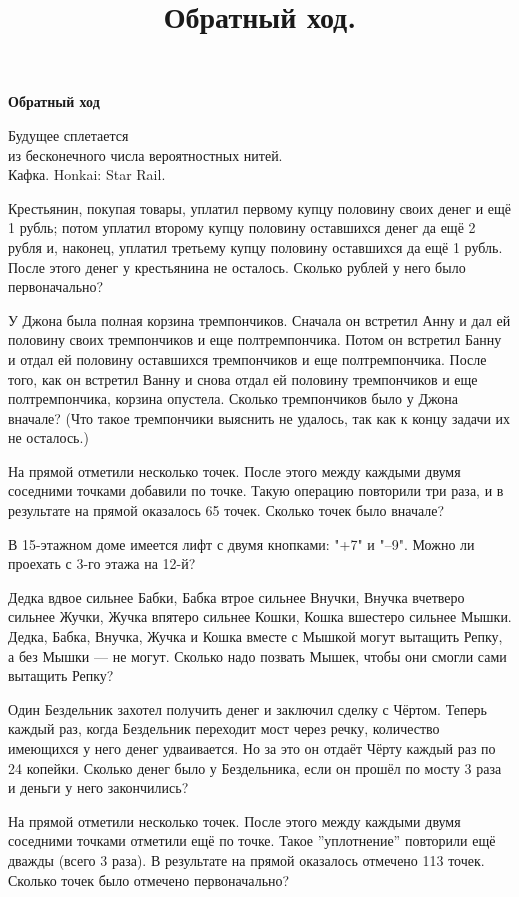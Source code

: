 \centerline{\bf \Huge Обратный ход}
\title{Обратный ход.}

\begin{flushright}
    \scriptsize Будущее сплетается\\ из бесконечного числа вероятностных нитей.\\Кафка. Honkai: Star Rail.
\end{flushright}

 Крестьянин, покупая товары, уплатил первому купцу половину своих денег и ещё 1 рубль; потом уплатил второму купцу половину оставшихся денег да ещё 2 рубля и, наконец, уплатил третьему купцу половину оставшихся да ещё 1 рубль. После этого денег у крестьянина не осталось. Сколько рублей у него было первоначально?

 У Джона была полная корзина тремпончиков. Сначала он встретил Анну и дал ей половину своих тремпончиков и еще полтремпончика. Потом он встретил Банну и отдал ей половину оставшихся тремпончиков и еще полтремпончика. После того, как он встретил Ванну и снова отдал ей половину тремпончиков и еще полтремпончика, корзина опустела. Сколько тремпончиков было у Джона вначале? (Что такое тремпончики выяснить не удалось, так как к концу задачи их не осталось.)

 На прямой отметили несколько точек. После этого между каждыми двумя соседними точками добавили по точке. Такую операцию повторили три раза, и в результате на прямой оказалось 65 точек. Сколько точек было вначале?

 В 15-этажном доме имеется лифт с двумя кнопками: "+7" и "–9". Можно ли проехать с 3-го этажа на 12-й? 

 Дедка вдвое сильнее Бабки, Бабка втрое сильнее Внучки, Внучка вчетверо сильнее Жучки, Жучка впятеро сильнее Кошки, Кошка вшестеро сильнее Мышки. Дедка, Бабка, Внучка, Жучка и Кошка вместе с Мышкой могут вытащить Репку, а без Мышки — не могут. Сколько надо позвать Мышек, чтобы они смогли сами вытащить Репку?

 Один Бездельник захотел получить денег и заключил сделку с Чёртом. Теперь каждый раз, когда Бездельник переходит мост через речку, количество имеющихся у него денег удваивается. Но за это он отдаёт Чёрту каждый раз по 24 копейки. Сколько денег было у Бездельника, если он прошёл по мосту 3 раза и деньги у него закончились?

 На прямой отметили несколько точек. После этого между каждыми двумя соседними точками отметили ещё по точке. Такое ''уплотнение'' повторили ещё дважды (всего 3 раза). В результате на прямой оказалось отмечено 113 точек. Сколько точек было отмечено первоначально? 

